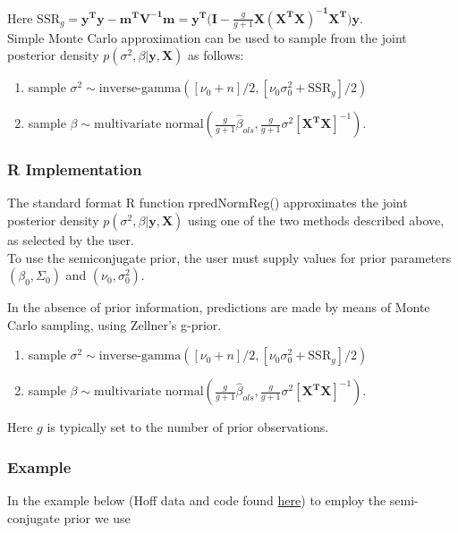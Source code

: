 \documentclass[12pt, a4paper]{article}
\begin{document}
Here $\text{SSR}_g = \mathbf{y^Ty - m^TV^{-1}m = y^T(I - }\frac{g}{g+1}\mathbf{X(X^TX)^{-1}X^T)y}$.\\

Simple Monte Carlo approximation can be used to sample from the joint posterior density $p(\sigma^2,\beta|\mathbf{y,X})$ as follows:

\begin{enumerate}
    \item sample $\sigma^2 \sim \text{inverse-gamma}([\nu_0 + n]/2,[\nu_0\sigma^2_0 + \text{SSR}_g]/2)$
    \item sample $\beta \sim \text{multivariate normal}\left(\frac{g}{g+1}\hat{\beta}_{ols},\frac{g}{g+1}\sigma^2[\mathbf{X^TX}]^{-1}\right)$.
\end{enumerate}

  \subsubsection{R Implementation}

The standard format R function rpredNormReg() approximates the joint posterior density $p(\sigma^2,\beta|\mathbf{y,X})$ using one of the two methods described above, as selected by the user.\\

To use the semiconjugate prior, the user must supply values for prior parameters $(\beta_0, \Sigma_0)$ and $(\nu_0, \sigma^2_0)$.

In the absence of prior information, predictions are made by means of Monte Carlo sampling, using Zellner's g-prior.

\begin{enumerate}
    \item sample $\sigma^2 \sim \text{inverse-gamma}([\nu_0 + n]/2,[\nu_0\sigma^2_0 + \text{SSR}_g]/2)$
    \item sample $\beta \sim \text{multivariate normal}\left(\frac{g}{g+1}\hat{\beta}_{ols},\frac{g}{g+1}\sigma^2[\mathbf{X^TX}]^{-1}\right)$.
\end{enumerate}

Here $g$ is typically set to the number of prior observations.



  \subsubsection{Example}

In the example below (Hoff data and code found \href{https://pdhoff.github.io/book/}{here}) to employ the semi-conjugate prior we use
\end{document}
